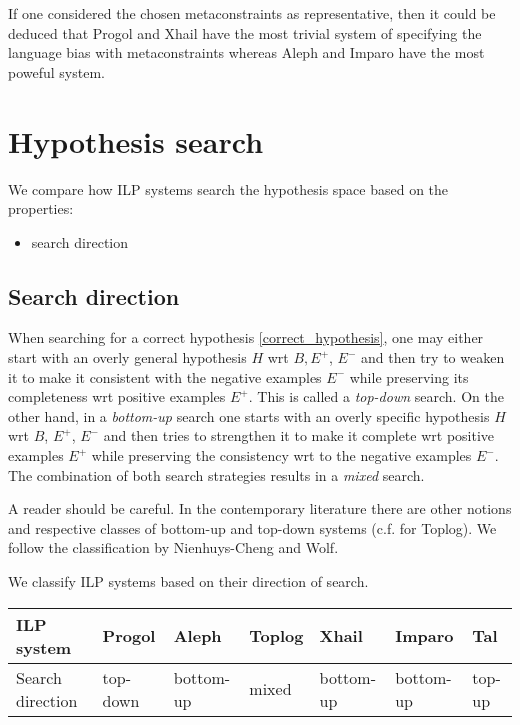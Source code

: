 If one considered the chosen metaconstraints as representative, then it could be deduced that Progol and Xhail have the most trivial system of specifying the language bias with metaconstraints whereas Aleph and Imparo have the most poweful system.

\section{Hypothesis search}
We compare how ILP systems search the hypothesis space based on the properties:
\begin{itemize}
\item search direction
\end{itemize}

\subsection{Search direction\cite{nienhuys1997foundations}}
When searching for a correct hypothesis \ref{correct_hypothesis}, one may either start with an overly general hypothesis $H$ wrt $B, E^+$, $E^-$ and then try to weaken it to make it consistent with the negative examples $E^-$ while preserving its completeness wrt positive examples $E^+$. This is called a \emph{top-down} search.
On the other hand, in a \emph{bottom-up} search one starts with an overly specific hypothesis $H$ wrt $B$, $E^+$, $E^-$ and then tries to strengthen it to make it complete wrt positive examples $E^+$ while preserving the consistency wrt to the negative examples $E^-$.
The combination of both search strategies results in a \emph{mixed} search.

\begin{remark}
A reader should be careful. In the contemporary literature there are other notions and respective classes of bottom-up and top-down systems (c.f.\cite{corapi2010inductive} for Toplog). We follow the classification by Nienhuys-Cheng and Wolf\cite{nienhuys1997foundations}.
\end{remark}

We classify ILP systems based on their direction of search.

\begin{center}
\label{tab:title} 
\begin{tabular}{| l | l | l | l | l | l | l |}
    \hline
    ILP system & Progol & Aleph & Toplog & Xhail & Imparo & Tal \\ \hline
   	Search direction & top-down & bottom-up& mixed & bottom-up & bottom-up & top-up\\ \hline
\end{tabular}
\end{center}

